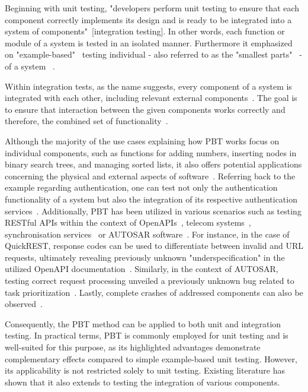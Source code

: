 \documentclass[runningheads]{llncs}
\begin{document}
Beginning with unit testing, "developers perform unit testing to ensure that each component correctly implements its design and is ready to be integrated into a system of components"~[integration testing]. In other words, each function or module of a system is tested in an isolated manner. Furthermore it emphasized on "example-based"~\cite{Corgozinho2023} testing individual - also referred to as the "smallest parts"~\cite{Aniche2022} - of a system ~\cite{Hartmann2000,Corgozinho2023}.

Within integration tests, as the name suggests, every component of a system is integrated with each other, including relevant external components~\cite{Aniche2022,Hartmann2000,Radziwill2020}. The goal is to ensure that interaction between the given components works correctly and therefore, the combined set of functionality~\cite{Hartmann2000,Aniche2022}.

Although the majority of the use cases explaining how PBT works focus on individual components, such as functions for adding numbers, inserting nodes in binary search trees,
and managing sorted lists, it also offers potential applications concerning the physical and external aspects of software~\cite{Chen2022}. Referring back to the example regarding authentication, one can test not only the authentication functionality of a system but also the integration of its respective authentication services~\cite{Fink1997}. Additionally, PBT has been utilized in various scenarios such as testing RESTful APIs within the context of OpenAPIs~\cite{Karlsson2019}, telecom systems~\cite{Arts2006}, synchronisation services~\cite{Hughes2016} or AUTOSAR software~\cite{Arts2015}. For instance, in the case of QuickREST, response codes can be used to differentiate between invalid and URL requests, ultimately revealing previously unknown "underspecification" in the utilized OpenAPI documentation~\cite{Karlsson2019}. Similarly, in the context of AUTOSAR, testing correct request processing unveiled a previously unknown bug related to task prioritization~\cite{Arts2015}. Lastly, complete crashes of addressed components can also be observed~\cite{Arts2006}.

Consequently, the PBT method can be applied to both unit and integration testing. In practical terms, PBT is commonly employed for unit testing and is well-suited for this purpose, as its highlighted advantages demonstrate complementary effects compared to simple example-based unit testing. However, its applicability is not restricted solely to unit testing. Existing literature has shown that it also extends to testing the integration of various components.
\end{document}
